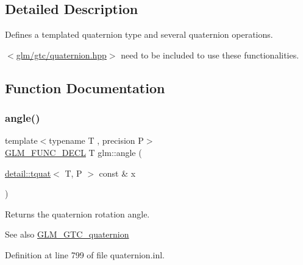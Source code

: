 \subsection{Detailed Description}
Defines a templated quaternion type and several quaternion operations. 

$<$\hyperlink{gtc_2quaternion_8hpp}{glm/gtc/quaternion.\+hpp}$>$ need to be included to use these functionalities. 

\subsection{Function Documentation}
\mbox{\label{group__gtc__quaternion_ga23a3fc7ada5bbb665ff84c92c6e0542c}} 
\subsubsection{\texorpdfstring{angle()}{angle()}}
{\footnotesize\ttfamily template$<$typename T , precision P$>$ \\
\hyperlink{setup_8hpp_ab2d052de21a70539923e9bcbf6e83a51}{G\+L\+M\+\_\+\+F\+U\+N\+C\+\_\+\+D\+E\+CL} T glm\+::angle (\begin{DoxyParamCaption}\item[{\hyperlink{structglm_1_1detail_1_1tquat}{detail\+::tquat}$<$ T, P $>$ const \&}]{x }\end{DoxyParamCaption})}

Returns the quaternion rotation angle.

\begin{DoxySeeAlso}{See also}
\hyperlink{group__gtc__quaternion}{G\+L\+M\+\_\+\+G\+T\+C\+\_\+quaternion} 
\end{DoxySeeAlso}


Definition at line 799 of file quaternion.\+inl.

\mbox{\label{group__gtc__quaternion_ga771b3e16cca8324e7111b923476be666}} 
